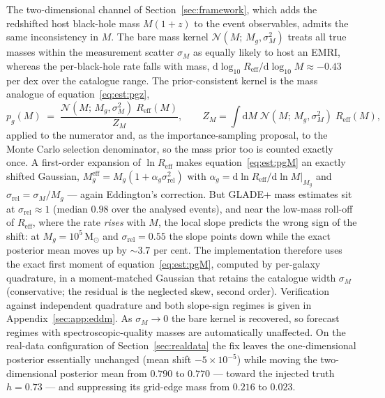 The two-dimensional channel of Section~\ref{sec:framework}, which adds the redshifted host black-hole mass $M(1+z)$ to the event observables, admits the same inconsistency in $M$. The bare mass kernel $\mathcal{N}(M;\, M_g, \sigma_M^2)$ treats all true masses within the measurement scatter $\sigma_M$ as equally likely to host an EMRI, whereas the per-black-hole rate falls with mass, $\mathrm{d}\log_{10} R_\mathrm{eff}/\mathrm{d}\log_{10} M \approx -0.43$ per dex over the catalogue range. %
The prior-consistent kernel is the mass analogue of equation~\eqref{eq:est:pgz},
\begin{equation}
  p_g(M) \;=\; \frac{\mathcal{N}(M;\, M_g, \sigma_M^2)\; R_\mathrm{eff}(M)}{Z_M},
  \qquad
  Z_M = \int \mathrm{d}M\; \mathcal{N}(M;\, M_g, \sigma_M^2)\; R_\mathrm{eff}(M),
  \label{eq:est:pgM}
\end{equation}
applied to the numerator and, as the importance-sampling proposal, to the Monte Carlo selection denominator, so the mass prior too is counted exactly once. A first-order expansion of $\ln R_\mathrm{eff}$ makes equation~\eqref{eq:est:pgM} an exactly shifted Gaussian, $M_g^\mathrm{eff} = M_g(1 + \alpha_g \sigma_\mathrm{rel}^2)$ with $\alpha_g = \mathrm{d}\ln R_\mathrm{eff}/\mathrm{d}\ln M|_{M_g}$ and $\sigma_\mathrm{rel} = \sigma_M/M_g$ --- again Eddington's correction. But GLADE+ mass estimates sit at $\sigma_\mathrm{rel} \approx 1$ (median $0.98$ over the analysed events), %
and near the low-mass roll-off of $R_\mathrm{eff}$, where the rate \emph{rises} with $M$, the local slope predicts the wrong sign of the shift: at $M_g = 10^5\,\mathrm{M}_\odot$ and $\sigma_\mathrm{rel} = 0.55$ the slope points down while the exact posterior mean moves up by ${\sim}3.7$ per cent. %
The implementation therefore uses the exact first moment of equation~\eqref{eq:est:pgM}, computed by per-galaxy quadrature, in a moment-matched Gaussian that retains the catalogue width $\sigma_M$ (conservative; the residual is the neglected skew, second order). Verification against independent quadrature and both slope-sign regimes is given in Appendix~\ref{sec:app:eddm}. As $\sigma_M \to 0$ the bare kernel is recovered, so forecast regimes with spectroscopic-quality masses are automatically unaffected. On the real-data configuration of Section~\ref{sec:realdata} the fix leaves the one-dimensional posterior essentially unchanged (mean shift $-5 \times 10^{-5}$) while moving the two-dimensional posterior mean from $0.790$ to $0.770$ --- toward the injected truth $h = 0.73$ --- and suppressing its grid-edge mass from $0.216$ to $0.023$. %

